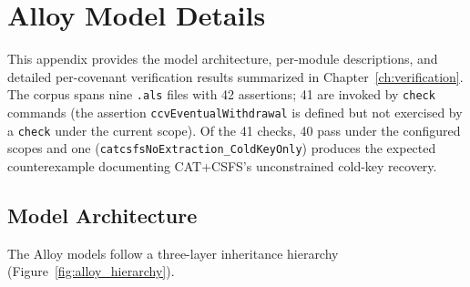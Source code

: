 \chapter{Alloy Model Details} \label{app:alloy_details}

This appendix provides the model architecture, per-module descriptions, and
detailed per-covenant verification results summarized in
Chapter~\ref{ch:verification}. The corpus spans nine \texttt{.als}
files with 42 assertions; 41 are invoked by \texttt{check} commands
(the assertion \texttt{ccvEventualWithdrawal} is defined but not
exercised by a \texttt{check} under the current scope). Of the 41
checks, 40 pass under the configured scopes and one
(\texttt{catcsfsNoExtraction\_ColdKeyOnly}) produces the expected
counterexample documenting CAT+CSFS's unconstrained cold-key
recovery.

\section{Model Architecture}

The Alloy models follow a three-layer inheritance hierarchy
(Figure~\ref{fig:alloy_hierarchy}).

